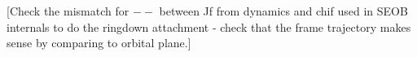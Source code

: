 \documentclass[aps,showpacs,twocolumn,
prd,superscriptaddress,nofootinbib]{revtex4-1}
\newcommand{\SM}[1]{{\color{Red} #1}}
\begin{document}

\SM{[Check the mismatch for $--$ between Jf from dynamics and chif used in SEOB internals to do the ringdown attachment - check that the frame trajectory makes sense by comparing to orbital plane.]}

\end{document}
